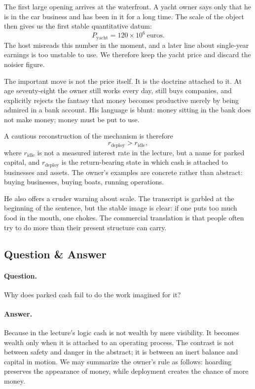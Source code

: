 The first large opening arrives at the waterfront. A yacht owner says only that he is in the car business and has been in it for a long time. The scale of the object then gives us the first stable quantitative datum:
\begin{equation}
P_{\text{yacht}} = 120\times 10^{6}\ \text{euros}.
\end{equation}
The host misreads this number in the moment, and a later line about single-year earnings is too unstable to use. We therefore keep the yacht price and discard the noisier figure.

The important move is not the price itself. It is the doctrine attached to it. At age seventy-eight the owner still works every day, still buys companies, and explicitly rejects the fantasy that money becomes productive merely by being admired in a bank account. His language is blunt: money sitting in the bank does not make money; money must be put to use.

A cautious reconstruction of the mechanism is therefore
\begin{equation}
r_{\text{deploy}} > r_{\text{idle}},
\end{equation}
where \(r_{\text{idle}}\) is not a measured interest rate in the lecture, but a name for parked capital, and \(r_{\text{deploy}}\) is the return-bearing state in which cash is attached to businesses and assets. The owner's examples are concrete rather than abstract: buying businesses, buying boats, running operations.

He also offers a cruder warning about scale. The transcript is garbled at the beginning of the sentence, but the stable image is clear: if one puts too much food in the mouth, one chokes. The commercial translation is that people often try to do more than their present structure can carry.

\subsection{Question \& Answer}

\paragraph{Question.} Why does parked cash fail to do the work imagined for it?

\paragraph{Answer.} Because in the lecture's logic cash is not wealth by mere visibility. It becomes wealth only when it is attached to an operating process. The contrast is not between safety and danger in the abstract; it is between an inert balance and capital in motion. We may summarize the owner's rule as follows: hoarding preserves the appearance of money, while deployment creates the chance of more money.

